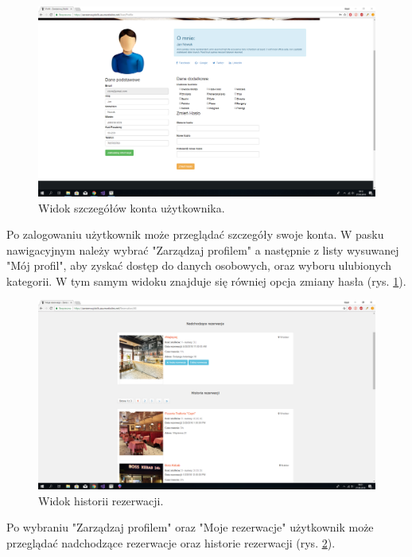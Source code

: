 \documentclass{article}
\begin{document}
\begin{figure}[H]
\centering
	\includegraphics[width=1.00\textwidth]{screens/account_profile.png}
	\caption[caption]{Widok szczegółów konta użytkownika.}
	\label{fig:account_details}
\end{figure}

Po zalogowaniu użytkownik może przeglądać szczegóły swoje konta. W pasku nawigacyjnym należy wybrać "Zarządzaj profilem" a następnie z listy wysuwanej "Mój profil", aby zyskać dostęp do danych osobowych, oraz wyboru ulubionych kategorii. W tym samym widoku znajduje się równiej opcja zmiany hasła (rys. \ref{fig:account_details}).

\begin{figure}[H]
\centering
	\includegraphics[width=1.00\textwidth]{screens/reservations_history.png}
	\caption[caption]{Widok historii rezerwacji.}
	\label{fig:account_reservations_history}
\end{figure}

Po wybraniu "Zarządzaj profilem" oraz "Moje rezerwacje" użytkownik może przeglądać nadchodzące rezerwacje oraz historie rezerwacji (rys. \ref{fig:account_reservations_history}).
\end{document}
